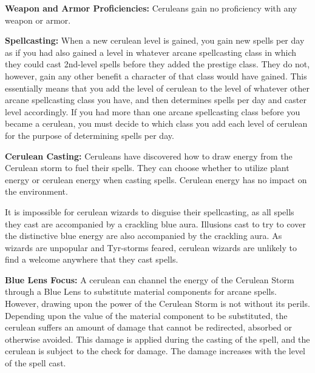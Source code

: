 {
\textbf{Weapon and Armor Proficiencies:} Ceruleans gain no proficiency with any weapon or armor.

\textbf{Spellcasting:} When a new cerulean level is gained, you gain new spells per day as if you had also gained a level in whatever arcane spellcasting class in which they could cast 2nd-level spells before they added the prestige class. They do not, however, gain any other benefit a character of that class would have gained. This essentially means that you add the level of cerulean to the level of whatever other arcane spellcasting class you have, and then determines spells per day and caster level accordingly. If you had more than one arcane spellcasting class before you became a cerulean, you must decide to which class you add each level of cerulean for the purpose of determining spells per day.

\textbf{Cerulean Casting:} Ceruleans have discovered how to draw energy from the Cerulean storm to fuel their spells. They can choose whether to utilize plant energy or cerulean energy when casting spells. Cerulean energy has no impact on the environment.

It is impossible for cerulean wizards to disguise their spellcasting, as all spells they cast are accompanied by a crackling blue aura. Illusions cast to try to cover the distinctive blue energy are also accompanied by the crackling aura. As wizards are unpopular and Tyr-storms feared, cerulean wizards are unlikely to find a welcome anywhere that they cast spells.

\textbf{Blue Lens Focus:} A cerulean can channel the energy of the Cerulean Storm through a Blue Lens to substitute material components for arcane spells. However, drawing upon the power of the Cerulean Storm is not without its perils. Depending upon the value of the material component to be substituted, the cerulean suffers an amount of damage that cannot be redirected, absorbed or otherwise avoided. This damage is applied during the casting of the spell, and the cerulean is subject to the  check for damage. The damage increases with the level of the spell cast.


}
